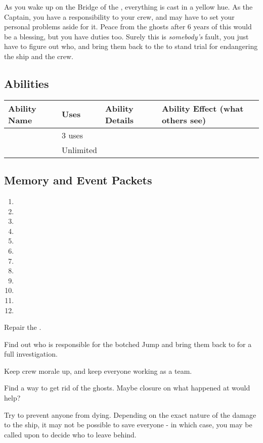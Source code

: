 \documentclass[char]{TMFHope}
\begin{document}
As you wake up on the Bridge of the \pNew{}, everything is cast in a yellow hue. As the Captain, you have a responsibility to your crew, and may have to set your personal problems aside for it. Peace from the ghosts after 6 years of this would be a blessing, but you have duties too. Surely this is \emph{somebody's} fault, you just have to figure out who, and bring them back to the \pPlan{} to stand trial for endangering the ship and the crew.

\subsection*{Abilities}
\begin{tabular}{|p{3cm}|p{1.5cm}|p{8cm}|p{3.5cm}|} 
\hline
 \textbf{Ability Name} & \textbf{Uses} & \textbf{Ability Details} & \textbf{Ability Effect (what others see)} \\ 
\hline
 \aTruth{\MYname} & 3 uses & \aTruth{\MYtext} & \aTruth{\MYeffect} \\ 
\hline
	\aPractice{\MYname} & Unlimited & \aPractice{\MYtext} & \aPractice{\MYeffect} \\ 
\hline
\end{tabular}

\subsection*{Memory and Event Packets}
\begin{enumerate}
	\item \mPractice{\MYname}
	\item \mCAlpha{\MYname}
	\item \mCaptainOne{\MYname}
	\item \mCaptainTwo{\MYname}
	\item \mCClosure{\MYname}
	\item \mBroom{\MYname}
	\item \mLab{\MYname}
	\item \mPatient{\MYname}
	\item \mKitchen{\MYname}
	\item \mWeight{\MYname}
	\item \mTheater{\MYname}
	\item \mCrates{\MYname}
\end{enumerate}

\begin{itemz}[Goals]
	\item Repair the \pNew{}.
	\item Find out who is responsible for the botched Jump and bring them back to \pHome{} for a full investigation.
	\item Keep crew morale up, and keep everyone working as a team.
	\item Find a way to get rid of the ghosts. Maybe closure on what happened at \pBattle{} would help?
	\item Try to prevent anyone from dying. Depending on the exact nature of the damage to the ship, it may not be possible to save everyone - in which case, you may be called upon to decide who to leave behind.
\end{itemz}
\end{document}
